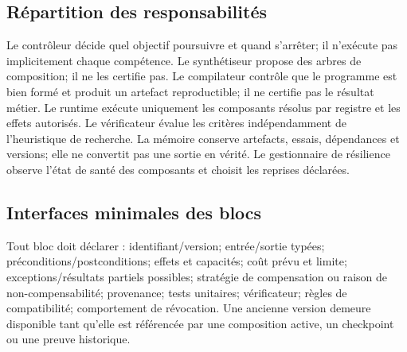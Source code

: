 \documentclass[11pt,a4paper]{article}
\theoremstyle{definition}
\theoremstyle{plain}
\theoremstyle{remark}
\begin{document}
\subsection{Répartition des responsabilités}
Le contrôleur décide quel objectif poursuivre et quand s'arrêter; il n'exécute pas implicitement chaque compétence. Le synthétiseur propose des arbres de composition; il ne les certifie pas. Le compilateur contrôle que le programme est bien formé et produit un artefact reproductible; il ne certifie pas le résultat métier. Le runtime exécute uniquement les composants résolus par registre et les effets autorisés. Le vérificateur évalue les critères indépendamment de l'heuristique de recherche. La mémoire conserve artefacts, essais, dépendances et versions; elle ne convertit pas une sortie en vérité. Le gestionnaire de résilience observe l'état de santé des composants et choisit les reprises déclarées.

\subsection{Interfaces minimales des blocs}
Tout bloc doit déclarer : identifiant/version; entrée/sortie typées; préconditions/postconditions; effets et capacités; coût prévu et limite; exceptions/résultats partiels possibles; stratégie de compensation ou raison de non-compensabilité; provenance; tests unitaires; vérificateur; règles de compatibilité; comportement de révocation. Une ancienne version demeure disponible tant qu'elle est référencée par une composition active, un checkpoint ou une preuve historique.
\end{document}
